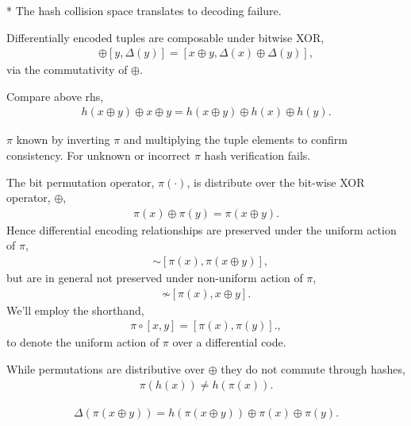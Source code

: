 \documentclass[twocolumn, aps, amsmath, amssymb, nofootinbib, superscriptaddress, longbibliography, doublefloatfix, table-of-contents, eqsecnum, rmp]{revtex4-2}
\begin{document}
* The hash collision space translates to decoding failure.

Differentially encoded tuples are composable under bitwise XOR,
\begin{align}
	[x,\Delta(x)] \oplus [y,\Delta(y)] = [x\oplus y, \Delta(x)\oplus \Delta(y)],
\end{align}
via the commutativity of $\oplus$.

Compare above rhs,
\begin{align}
	h(x\oplus y) \oplus x \oplus y = h(x \oplus y) \oplus h(x) \oplus h(y).
\end{align}

$\pi$ known by inverting $\pi$ and multiplying the tuple elements to confirm consistency. For unknown or incorrect $\pi$ hash verification fails.

The bit permutation operator, $\pi(\cdot)$, is distribute over the bit-wise XOR operator, $\oplus$,
\begin{align}
	\pi(x)\oplus \pi(y) = \pi(x\oplus y).
\end{align}
Hence differential encoding relationships are preserved under the uniform action of $\pi$,
\begin{align}
	[x,x\oplus y] &\sim [\pi(x), \pi(x\oplus y)],
\end{align}
but are in general not preserved under non-uniform action of $\pi$,
\begin{align}
	[x,x\oplus y] \not\sim [\pi(x), x\oplus y].
\end{align}
We'll employ the shorthand,
\begin{align}
	\pi\circ[x,y] = [\pi(x),\pi(y)].,
\end{align}
to denote the uniform action of $\pi$ over a differential code.

While permutations are distributive over $\oplus$ they do not commute through hashes,
\begin{align}
	\pi(h(x)) \neq h(\pi(x)).	
\end{align}

\begin{align}
	\Delta(\pi(x\oplus y)) = h(\pi(x\oplus y)) \oplus \pi(x) \oplus \pi(y).
\end{align}


\end{document}
